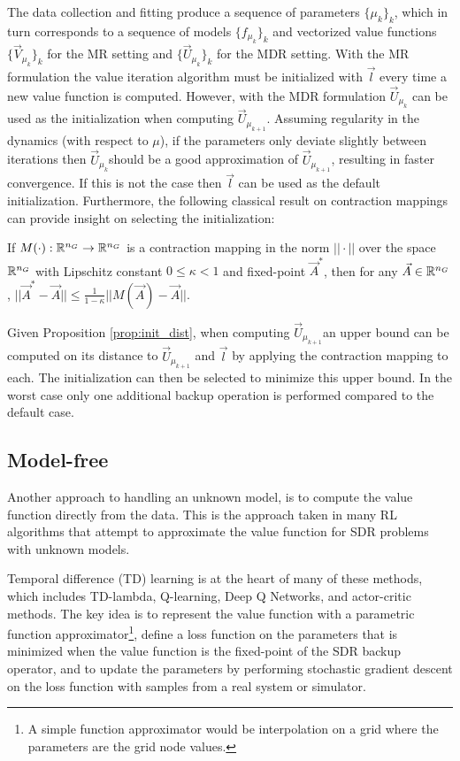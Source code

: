 The data collection and fitting produce a sequence of parameters $\{\mu_k\}_k$, which in turn corresponds to a sequence of models $\{f_{\mu_k}\}_k$ and vectorized value functions $\{\vec{V}_{\mu_k}\}_k$ for the MR setting and $\{\vec{U}_{\mu_k}\}_k$ for the MDR setting. With the MR formulation the value iteration algorithm must be initialized with $\vec{l}$ every time a new value function is computed. However, with the MDR formulation $\vec{U}_{\mu_k}$ can be used as the initialization when computing $\vec{U}_{\mu_{k+1}}$. Assuming regularity in the dynamics (with respect to $\mu$), if the parameters only deviate slightly between iterations then $\vec{U}_{\mu_{k}}$should be a good approximation of $\vec{U}_{\mu_{k+1}}$, resulting in faster convergence. If this is not the case then $\vec{l}$ can be used as the default initialization. Furthermore, the following classical result on contraction mappings can provide insight on selecting the initialization:  
%
\begin{proposition} \label{prop:init_dist}
If $M(\cdot): \mathbb{R}^{n_G} \rightarrow \mathbb{R}^{n_G}$ is a contraction mapping in the norm $|| \cdot ||$ over the space $\mathbb{R}^{n_G}$ with Lipschitz constant $0\leq \kappa < 1$ and fixed-point $\vec{A}^*$, then for any ${\vec{A} \in \mathbb{R}^{n_G}}$,  ${||\vec{A}^* - \vec{A}|| \leq \frac{1}{1-\kappa}||M(\vec{A}) - \vec{A}||}$. 
\end{proposition}

Given Proposition \ref{prop:init_dist}, when computing $\vec{U}_{\mu_{k+1}}$an upper bound can be computed on its distance to $\vec{U}_{\mu_{k+1}}$ and $\vec{l}$ by applying the contraction mapping to each. The initialization can then be selected to minimize this upper bound. In the worst case only one additional backup operation is performed compared to the default case. 

\subsection{Model-free}

Another approach to handling an unknown model, is to compute the value function directly from the data. This is the approach taken in many RL algorithms that attempt to approximate the value function for SDR problems with unknown models.

Temporal difference (TD) learning is at the heart of many of these methods, which includes TD-lambda\cite{Sutton1988}, Q-learning\cite{Watkins1992}, Deep Q Networks\cite{Mnih2016}, and actor-critic methods\cite{Konda2000}. The key idea is to represent the value function with a parametric function approximator\footnote{A simple function approximator would be interpolation on a grid where the parameters are the grid node values.}, define a loss function on the parameters that is minimized when the value function is the fixed-point of the SDR backup operator, and to update the parameters by performing stochastic gradient descent on the loss function with samples from a real system or simulator.

